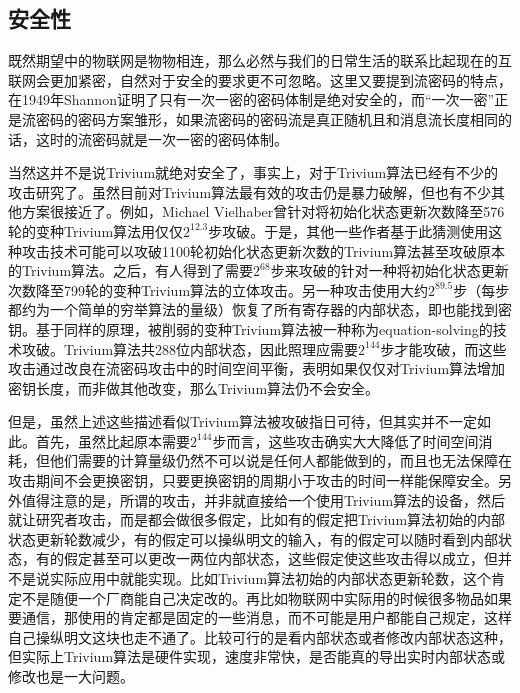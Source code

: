 \subsection{安全性}

既然期望中的物联网是物物相连，那么必然与我们的日常生活的联系比起现在的互联网会更加紧密，自然对于安全的要求更不可忽略。这里又要提到流密码的特点，在1949年Shannon证明了只有一次一密的密码体制是绝对安全的，而“一次一密”正是流密码的密码方案雏形，如果流密码的密码流是真正随机且和消息流长度相同的话，这时的流密码就是一次一密的密码体制。

当然这并不是说Trivium就绝对安全了，事实上，对于Trivium算法已经有不少的攻击研究了。虽然目前对Trivium算法最有效的攻击仍是暴力破解，但也有不少其他方案很接近了。例如，Michael Vielhaber曾针对将初始化状态更新次数降至576轮的变种Trivium算法用仅仅$2^{12.3}$步攻破\parencite{cryptoeprint:2007:413}。于是，其他一些作者基于此猜测使用这种攻击技术可能可以攻破1100轮初始化状态更新次数的Trivium算法甚至攻破原本的Trivium算法\parencite{cryptoeprint:2008:385}。之后，有人得到了需要$2^{68}$步来攻破的针对一种将初始化状态更新次数降至799轮的变种Trivium算法的立体攻击\parencite{cryptoeprint:2015:312}。另一种攻击使用大约$2^{89.5}$步（每步都约为一个简单的穷举算法的量级）恢复了所有寄存器的内部状态，即也能找到密钥\parencite{cryptoeprint:2007:021}。基于同样的原理，被削弱的变种Trivium算法被一种称为equation-solving的技术攻破\parencite{raddum2006cryptanalytic}。Trivium算法共288位内部状态，因此照理应需要$2^{144}$步才能攻破，而这些攻击通过改良在流密码攻击中的时间空间平衡，表明如果仅仅对Trivium算法增加密钥长度，而非做其他改变，那么Trivium算法仍不会安全。

但是，虽然上述这些描述看似Trivium算法被攻破指日可待，但其实并不一定如此。首先，虽然比起原本需要$2^{144}$步而言，这些攻击确实大大降低了时间空间消耗，但他们需要的计算量级仍然不可以说是任何人都能做到的，而且也无法保障在攻击期间不会更换密钥，只要更换密钥的周期小于攻击的时间一样能保障安全。另外值得注意的是，所谓的攻击，并非就直接给一个使用Trivium算法的设备，然后就让研究者攻击，而是都会做很多假定，比如有的假定把Trivium算法初始的内部状态更新轮数减少，有的假定可以操纵明文的输入，有的假定可以随时看到内部状态，有的假定甚至可以更改一两位内部状态，这些假定使这些攻击得以成立，但并不是说实际应用中就能实现。比如Trivium算法初始的内部状态更新轮数，这个肯定不是随便一个厂商能自己决定改的。再比如物联网中实际用的时候很多物品如果要通信，那使用的肯定都是固定的一些消息，而不可能是用户都能自己规定，这样自己操纵明文这块也走不通了。比较可行的是看内部状态或者修改内部状态这种，但实际上Trivium算法是硬件实现，速度非常快，是否能真的导出实时内部状态或修改也是一大问题。

